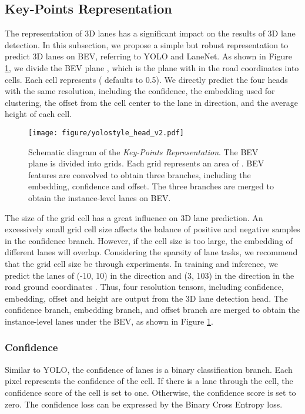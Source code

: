 \documentclass[10pt,twocolumn,letterpaper]{article}
\begin{document}
\subsection{Key-Points Representation}
The representation of 3D lanes has a significant impact on the results of 3D lane detection. In this subsection, we propose a simple but robust representation to predict 3D lanes on BEV, referring to YOLO\cite{redmon2016you} and LaneNet\cite{neven2018towards}. As shown in Figure \ref{fig:head}, we divide the BEV plane , which is the plane with  in the road coordinates  into  cells. Each cell represents  ( defaults to 0.5). We directly predict the four heads with the same resolution, including the confidence, the embedding used for clustering, the offset from the cell center to the lane in  direction, and the average height of each cell.
\begin{figure}
    \centering
\texttt{[image: figure/yolostyle\_head\_v2.pdf]}
      \caption{Schematic diagram of the \textit{Key-Points Representation}. The BEV plane  is divided into  grids. Each grid represents an area of  . BEV features are convolved to obtain three branches, including the embedding, confidence and offset. The three branches are merged to obtain the instance-level lanes on BEV.}
    \label{fig:head}
\end{figure}
The size of the grid cell has a great influence on 3D lane prediction. An excessively small grid cell size affects the balance of positive and negative samples in the confidence branch. However, if the cell size is too large, the embedding of different lanes will overlap. Considering the sparsity of lane tasks, we recommend that the grid cell size be   through experiments. In training and inference, we predict the lanes of (-10, 10) in the  direction and (3, 103) in the  direction in the road ground coordinates . Thus, four  resolution tensors, including confidence, embedding, offset and height are output from the 3D lane detection head. The confidence branch, embedding branch, and offset branch are merged to obtain the instance-level lanes under the BEV, as shown in Figure \ref{fig:head}.

\subsubsection{Confidence}
Similar to YOLO\cite{redmon2016you}, the confidence of lanes is a binary classification branch. Each pixel represents the confidence of the cell. If there is a lane through the cell, the confidence score of the cell is set to one. Otherwise, the confidence score is set to zero. The confidence loss can be expressed by the Binary Cross Entropy loss.
\end{document}
